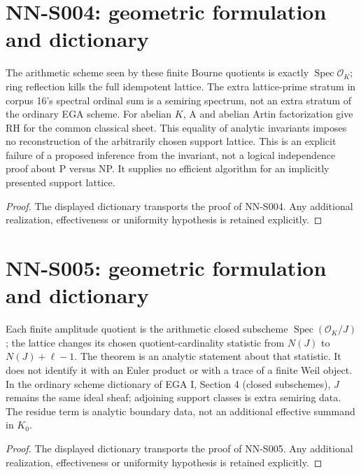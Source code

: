 \section{NN-S004: geometric formulation and dictionary}
\begin{geometricstatement}[NN-S004]
The arithmetic scheme seen by these finite Bourne quotients is
exactly $\operatorname{Spec}\mathcal O_K$; ring reflection kills
the full idempotent lattice. The extra lattice-prime stratum in
corpus 16's spectral ordinal sum is a semiring spectrum, not an
extra stratum of the ordinary EGA scheme. For abelian $K$, A and
abelian Artin factorization give RH for the common classical
sheet. This equality of analytic invariants imposes no reconstruction
of the arbitrarily chosen support lattice. This is an explicit
failure of a proposed inference from the invariant, not a logical
independence proof about P versus NP. It supplies no efficient
algorithm for an implicitly presented support lattice.
\end{geometricstatement}
\begin{proof} The displayed dictionary transports the proof of NN-S004. Any additional realization, effectiveness or uniformity hypothesis is retained explicitly.\end{proof}


\section{NN-S005: geometric formulation and dictionary}
\begin{geometricstatement}[NN-S005]
Each finite amplitude quotient is the arithmetic closed
subscheme $\operatorname{Spec}(\mathcal O_K/J)$; the lattice
changes its chosen quotient-cardinality statistic from $N(J)$ to
$N(J)+\ell-1$. The theorem is an analytic statement about that
statistic. It does not identify it with an Euler product or with
a trace of a finite Weil object. In the ordinary scheme dictionary
of EGA I, Section 4 (closed subschemes), $J$ remains the same
ideal sheaf; adjoining support classes is extra semiring data.
The residue term is analytic boundary data, not an additional
effective summand in $K_0$.
\end{geometricstatement}
\begin{proof} The displayed dictionary transports the proof of NN-S005. Any additional realization, effectiveness or uniformity hypothesis is retained explicitly.\end{proof}


